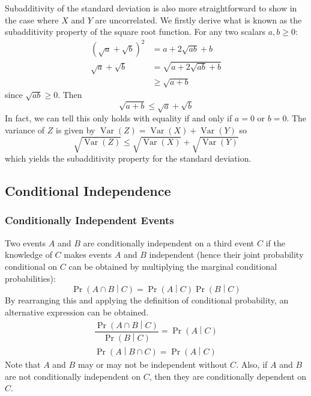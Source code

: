\documentclass[11pt]{report} %
\begin{document}
Subadditivity of the standard deviation is also more straightforward to show in the case where $X$ and $Y$ are uncorrelated. We firstly derive what is known as the subadditivity property of the square root function. For any two scalars $a, b \geq 0$:
\begin{align}
\left(\sqrt{a} + \sqrt{b}\right)^{2} &= a + 2\sqrt{ab} + b \\
\sqrt{a} + \sqrt{b} &= \sqrt{a + 2\sqrt{ab} + b} \\
&\geq \sqrt{a + b}
\end{align}
since $\sqrt{ab} \geq 0$. Then
\begin{equation}
\sqrt{a + b} \leq \sqrt{a} + \sqrt{b}
\end{equation}
In fact, we can tell this only holds with equality if and only if $a = 0$ or $b = 0$. The variance of $Z$ is given by $\operatorname{Var}\left(Z\right) = \operatorname{Var}\left(X\right) + \operatorname{Var}\left(Y\right)$ so
\begin{equation}
\sqrt{\operatorname{Var}\left(Z\right)} \leq \sqrt{\operatorname{Var}\left(X\right)} + \sqrt{\operatorname{Var}\left(Y\right)}
\end{equation}
which yields the subadditivity property for the standard deviation.

\subsection{Conditional Independence}

\subsubsection{Conditionally Independent Events}
Two events $A$ and $B$ are conditionally independent on a third event $C$ if the knowledge of $C$ makes events $A$ and $B$ independent (hence their joint probability conditional on $C$ can be obtained by multiplying the marginal conditional probabilities):
\begin{equation}
\operatorname{Pr}\left(A\cap B\middle|C\right) = \operatorname{Pr}\left(A\middle|C\right)\operatorname{Pr}\left(B\middle|C\right)
\end{equation}
By rearranging this and applying the definition of conditional probability, an alternative expression can be obtained.
\begin{gather}
\dfrac{\operatorname{Pr}\left(A\cap B\middle|C\right)}{\operatorname{Pr}\left(B\middle|C\right)} = \operatorname{Pr}\left(A\middle|C\right) \\
\operatorname{Pr}\left(A\middle|B \cap C\right) = \operatorname{Pr}\left(A\middle|C\right)
\end{gather}
Note that $A$ and $B$ may or may not be independent without $C$. Also, if $A$ and $B$ are not conditionally independent on $C$, then they are conditionally dependent on $C$.
\end{document}

